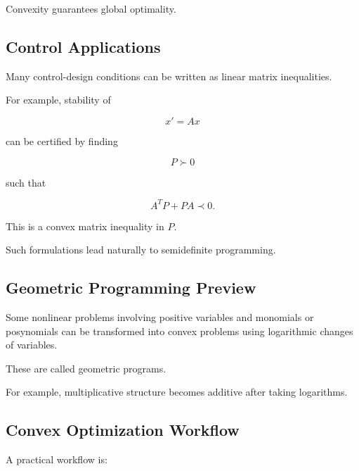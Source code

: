 Convexity guarantees global optimality.

\subsection{Control Applications}
\label{subsec:convex-control-applications}

Many control-design conditions can be written as linear matrix
inequalities.

For example, stability of

\[
x'=Ax
\]

can be certified by finding

\[
P\succ0
\]

such that

\[
\boxed{
A^TP+PA\prec0.
}
\]

This is a convex matrix inequality in \(P\).

Such formulations lead naturally to semidefinite programming.

\subsection{Geometric Programming Preview}
\label{subsec:geometric-programming-preview}

Some nonlinear problems involving positive variables and monomials or
posynomials can be transformed into convex problems using logarithmic
changes of variables.

These are called geometric programs.

For example, multiplicative structure becomes additive after taking
logarithms.

\subsection{Convex Optimization Workflow}
\label{subsec:convex-optimization-workflow}

A practical workflow is:

